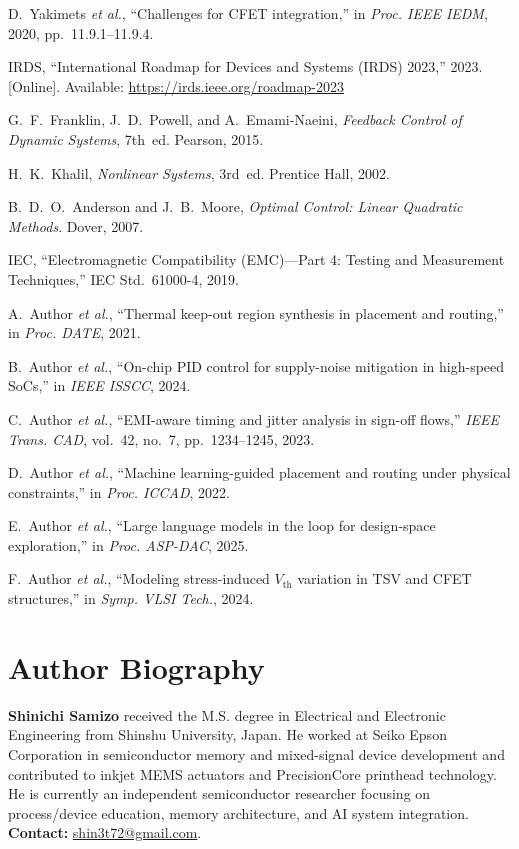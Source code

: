 \documentclass[conference]{IEEEtran}
\newcommand{\etal}{\textit{et al.}}
\begin{document}
\begin{thebibliography}{99}

D.~Yakimets \etal, ``Challenges for CFET integration,'' in \emph{Proc. IEEE IEDM}, 2020, pp.~11.9.1--11.9.4.

IRDS, ``International Roadmap for Devices and Systems (IRDS) 2023,'' 2023. [Online]. Available: \url{https://irds.ieee.org/roadmap-2023}

G.~F.~Franklin, J.~D.~Powell, and A.~Emami-Naeini, \emph{Feedback Control of Dynamic Systems}, 7th~ed. Pearson, 2015.

H.~K.~Khalil, \emph{Nonlinear Systems}, 3rd~ed. Prentice Hall, 2002.

B.~D.~O.~Anderson and J.~B.~Moore, \emph{Optimal Control: Linear Quadratic Methods}. Dover, 2007.

IEC, ``Electromagnetic Compatibility (EMC)---Part 4: Testing and Measurement Techniques,'' IEC Std.~61000-4, 2019.

A.~Author \etal, ``Thermal keep-out region synthesis in placement and routing,'' in \emph{Proc. DATE}, 2021.

B.~Author \etal, ``On-chip PID control for supply-noise mitigation in high-speed SoCs,'' in \emph{IEEE ISSCC}, 2024.

C.~Author \etal, ``EMI-aware timing and jitter analysis in sign-off flows,'' \emph{IEEE Trans. CAD}, vol.~42, no.~7, pp.~1234--1245, 2023.

D.~Author \etal, ``Machine learning-guided placement and routing under physical constraints,'' in \emph{Proc. ICCAD}, 2022.

E.~Author \etal, ``Large language models in the loop for design-space exploration,'' in \emph{Proc. ASP-DAC}, 2025.

F.~Author \etal, ``Modeling stress-induced $V_\mathrm{th}$ variation in TSV and CFET structures,'' in \emph{Symp. VLSI Tech.}, 2024.

\end{thebibliography}

\section*{Author Biography}
\textbf{Shinichi Samizo} received the M.S. degree in Electrical and Electronic Engineering from Shinshu University, Japan. He worked at Seiko Epson Corporation in semiconductor memory and mixed-signal device development and contributed to inkjet MEMS actuators and PrecisionCore printhead technology. He is currently an independent semiconductor researcher focusing on process/device education, memory architecture, and AI system integration. \textbf{Contact:} \href{mailto:shin3t72@gmail.com}{shin3t72@gmail.com}.
\end{document}
